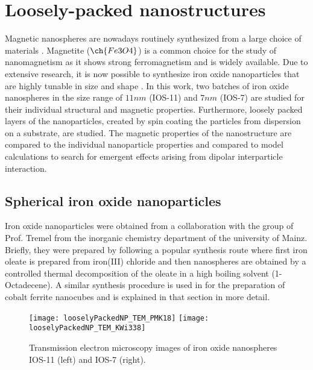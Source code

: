 \documentclass[\main/dresen_thesis.tex]{subfiles}
\begin{document}
  \chapter{Loosely-packed nanostructures}\label{ch:looselyPackedNS}
    Magnetic nanospheres are nowadays routinely synthesized from a large choice of materials \cite{Gubin_2005_Magne}.
    Magnetite ($\ch{Fe3O4}$) is a common choice for the study of nanomagnetism as it shows strong ferromagnetism and is widely available.
    Due to extensive research, it is now possible to synthesize iron oxide nanoparticles that are highly tunable in size and shape \cite{Wetterskog_2014_Preci}.
    In this work, two batches of iron oxide nanospheres in the size range of $11 \unit{nm}$ (IOS-11) and $7 \unit{nm}$ (IOS-7) are studied for their individual structural and magnetic properties.
    Furthermore, loosely packed layers of the nanoparticles, created by spin coating the particles from dispersion on a substrate, are studied.
    The magnetic properties of the nanostructure are compared to the individual nanoparticle properties and compared to model calculations to search for emergent effects arising from dipolar interparticle interaction.

    \section{Spherical iron oxide nanoparticles}
    Iron oxide nanoparticles were obtained from a collaboration with the group of Prof. Tremel from the inorganic chemistry department of the university of Mainz.
    Briefly, they were prepared by following a popular synthesis route where first iron oleate is prepared from iron(III) chloride and then nanospheres are obtained by a controlled thermal decomposition of the oleate in a high boiling solvent (1-Octadecene).
    A similar synthesis procedure is used in  for the preparation of cobalt ferrite nanocubes and is explained in that section in more detail.

    \begin{figure}[tb]
      \centering
      \texttt{[image: looselyPackedNP\_TEM\_PMK18]}
      \texttt{[image: looselyPackedNP\_TEM\_KWi338]}
      \caption{\label{fig:looselyPackedNP:nanoparticle:tem}Transmission electron microscopy images of iron oxide nanospheres IOS-11 (left) and IOS-7 (right).}
    \end{figure}
\end{document}
